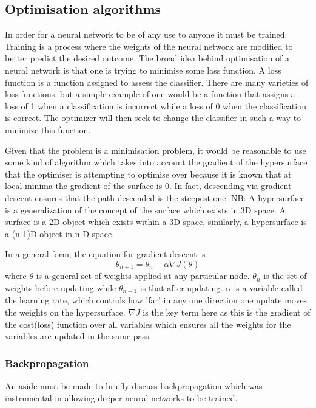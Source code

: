 \documentclass[a4paper,fleqn,usenatbib]{mnras}
\begin{document}
\subsection{Optimisation algorithms}
In order for a neural network to be of any use to anyone it must be trained. Training is a process where the weights of the neural network are modified to better predict the desired outcome. The broad idea behind optimisation of a neural network is that one is trying to minimise some loss function. A loss function is a function assigned to assess the classifier. There are many varieties of loss functions, but a simple example of one would be a function that assigns a loss of 1 when a classification is incorrect while a loss of 0 when the classification is correct. The optimizer will then seek to change the classifier in such a way to minimize this function. 

Given that the problem is a minimisation problem, it would be reasonable to use some kind of algorithm which takes into account the gradient of the hypersurface that the optimiser is attempting to optimise over because it is known that at local minima the gradient of the surface is 0. In fact, descending via gradient descent ensures that the path descended is the steepest one. \citep{GradientDescent} NB: A hypersurface is a generalization of the concept of the surface which exists in 3D space. A surface is a 2D object which exists within a 3D space, similarly, a hypersurface is a (n-1)D object in n-D space. 

In a general form, the equation for gradient descent is 
\begin{equation}
\theta_{n+1}=\theta_{n}-\alpha\nabla J(\theta)	
\end{equation}
where $\theta$ is a general set of weights applied at any particular node. $\theta_{n}$ is the set of weights before updating while $\theta_{n+1}$ is that after updating. $\alpha$ is a variable called the learning rate, which controls how 'far' in any one direction one update moves the weights on the hypersurface. $\nabla J$ is the key term here as this is the gradient of the cost(loss) function over all variables which ensures all the weights for the variables are updated in the same pass. \citep{GradientDescent}

\subsubsection{Backpropagation}
\label{sec:BP}
An aside must be made to briefly discuss backpropagation which was instrumental in allowing deeper neural networks to be trained. 
\end{document}
